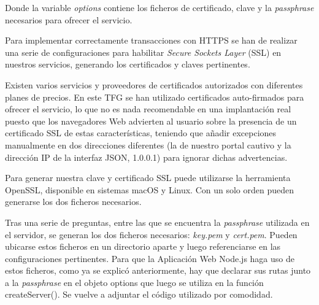 Donde la variable \emph{options} contiene los ficheros de certificado, clave y la \emph{passphrase} necesarios para ofrecer el servicio.

Para implementar correctamente transacciones con HTTPS se han de realizar una serie de configuraciones para habilitar \emph{Secure Sockets Layer} (SSL) en nuestros servicios, generando los certificados y claves pertinentes.

Existen varios servicios y proveedores de certificados autorizados con diferentes planes de precios. En este TFG se han utilizado certificados auto-firmados para ofrecer el servicio, lo que no es nada recomendable en una implantación real puesto que los navegadores Web advierten al usuario sobre la presencia de un certificado SSL de estas características, teniendo que añadir excepciones manualmente en dos direcciones diferentes (la de nuestro portal cautivo y la dirección IP de la interfaz JSON, 1.0.0.1) para ignorar dichas advertencias.

Para generar nuestra clave y certificado SSL puede utilizarse la herramienta OpenSSL, disponible en sistemas macOS y Linux. Con un solo orden pueden generarse los dos ficheros necesarios.


Tras una serie de preguntas, entre las que se encuentra la \emph{passphrase} utilizada en el servidor, se generan los dos ficheros necesarios: \emph{key.pem} y \emph{cert.pem}. Pueden ubicarse estos ficheros en un directorio aparte y luego referenciarse en las configuraciones pertinentes. Para que la Aplicación Web Node.js haga uso de estos ficheros, como ya se explicó anteriormente, hay que declarar sus rutas junto a la \emph{passphrase} en el objeto options que luego se utiliza en la función createServer(). Se vuelve a adjuntar el código utilizado por comodidad.


